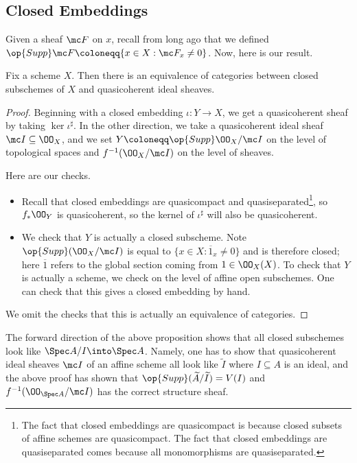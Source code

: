 \documentclass[../notes.tex]{subfiles}
\begin{document}
\subsection{Closed Embeddings}
Given a sheaf $\mc F$ on $x$, recall from long ago that we defined $\op{Supp}\mc F\coloneqq\{x\in X:\mc F_x\ne0\}$. Now, here is our result.
\begin{proposition}
	Fix a scheme $X$. Then there is an equivalence of categories between closed subschemes of $X$ and quasicoherent ideal sheaves.
\end{proposition}
\begin{proof}
	Beginning with a closed embedding $\iota\colon Y\to X$, we get a quasicoherent sheaf by taking $\ker\iota^\sharp$. In the other direction, we take a quasicoherent ideal sheaf $\mc I\subseteq\OO_X$, and we set $Y\coloneqq\op{Supp}\OO_X/\mc I$ on the level of topological spaces and $f^{-1}(\OO_X/\mc I)$ on the level of sheaves.

	Here are our checks.
	\begin{itemize}
		\item Recall that closed embeddings are quasicompact and quasiseparated\footnote{The fact that closed embeddings are quasicompact is because closed subsets of affine schemes are quasicompact. The fact that closed embeddings are quasiseparated comes because all monomorphisms are quasiseparated.}, so $f_*\OO_Y$ is quasicoherent, so the kernel of $\iota^\sharp$ will also be quasicoherent.
		\item We check that $Y$ is actually a closed subscheme. Note $\op{Supp}(\OO_X/\mc I)$ is equal to $\{x\in X:\overline1_x\ne0\}$ and is therefore closed; here $\overline1$ refers to the global section coming from $1\in\OO_X(X)$. To check that $Y$ is actually a scheme, we check on the level of affine open subschemes. One can check that this gives a closed embedding by hand.
	\end{itemize}
	We omit the checks that this is actually an equivalence of categories.
\end{proof}
\begin{remark}
	The forward direction of the above proposition shows that all closed subschemes look like $\Spec A/I\into\Spec A$. Namely, one has to show that quasicoherent ideal sheaves $\mc I$ of an affine scheme all look like $\widetilde I$ where $I\subseteq A$ is an ideal, and the above proof has shown that $\op{Supp}(\widetilde A/\widetilde I)=V(I)$ and $f^{-1}(\OO_{\Spec A}/\mc I)$ has the correct structure sheaf.
\end{remark}
\end{document}
